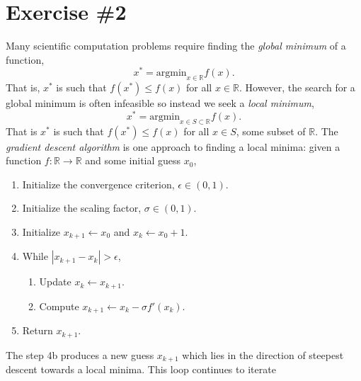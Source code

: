 \documentclass[12pt]{article}
\begin{document}
\section*{Exercise \#2}


Many scientific computation problems require finding the {\it global minimum} of
a function,
\[
  x^* = \text{argmin}_{x \in \mathbb{R}} f(x).
\]
That is, $x^*$ is such that $f(x^*) \leq f(x)$ for all $x \in \mathbb{R}$.
However, the search for a global minimum is often infeasible so instead we seek
a {\it local minimum},
\[
  x^* = \text{argmin}_{x \in S \subset \mathbb{R}} f(x).
\]
That is $x^*$ is such that $f(x^*) \leq f(x)$ for all $x \in S$, some subset of
$\mathbb{R}$. The {\it gradient descent algorithm} is one approach to finding a
local minima: given a function $f : \mathbb{R} \to \mathbb{R}$ and some initial
guess $x_0$,
\begin{enumerate}
\item Initialize the convergence criterion, $\epsilon \in (0,1)$.
\item Initialize the scaling factor, $\sigma \in (0,1)$.
\item Initialize $x_{k+1} \gets x_0$ and $x_k \gets x_0 + 1$.
\item While $|x_{k+1} - x_k| > \epsilon$,
\begin{enumerate}
\item Update $x_k \gets x_{k+1}$.
\item Compute $x_{k+1} \gets x_k - \sigma f'(x_k)$.
\end{enumerate}
\item Return $x_{k+1}$.
\end{enumerate}
The step 4b produces a new guess $x_{k+1}$ which lies in the direction of
steepest descent towards a local minima. This loop continues to iterate
\end{document}
